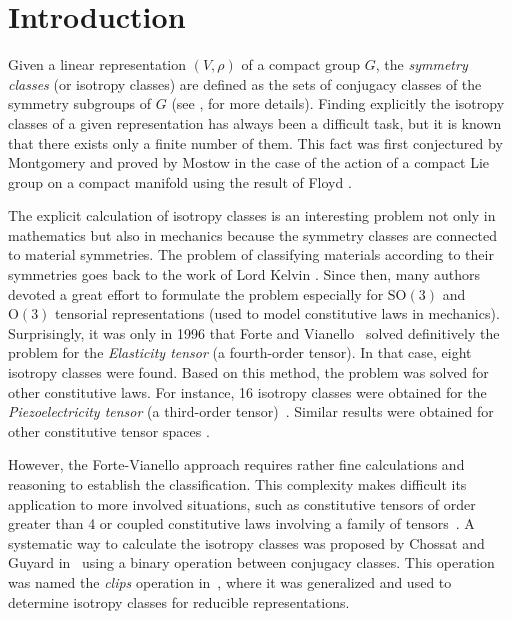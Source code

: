 \documentclass[11pt,a4paper]{amsart}
\theoremstyle{definition}
\newcommand{\OO}{\mathrm{O}}                %
\newcommand{\SO}{\mathrm{SO}}               %
\newcommand{\1}{\mathds{1}}		            %
\begin{document}
\begin{scriptsize}
  \setcounter{tocdepth}{2}
  \tableofcontents
\end{scriptsize}

\section{Introduction}
\label{sec:intro}

Given a linear representation $(V,\rho)$ of a compact group $G$, the \emph{symmetry classes} (or isotropy classes) are defined as the sets of conjugacy classes of the symmetry subgroups of $G$ (see \cite{Bredon1960}, for more details). Finding explicitly the isotropy classes of a given representation has always been a difficult task, but it is known that there exists only a finite number of them. This fact was first conjectured by Montgomery \cite[problem 45]{eilenberg1949} and proved by Mostow in the case of the action of a compact Lie group on a compact manifold \cite{Mostow1957} using the result of Floyd \cite{floyd1957}.

The explicit calculation of isotropy classes is an interesting problem not only in mathematics but also in mechanics because the symmetry classes are connected to material symmetries. The problem of classifying materials according to their symmetries goes back to the work of Lord Kelvin \cite{kelvin1890}. Since then, many authors devoted a great effort to formulate the problem especially for $\SO(3)$ and $\OO(3)$ tensorial representations (used to model constitutive laws in mechanics). Surprisingly, it was only in 1996 that Forte and Vianello~\cite{forte1996} solved definitively the problem for the \emph{Elasticity tensor} (a fourth-order tensor). In that case, eight isotropy classes were found. Based on this method, the problem was solved for other constitutive laws. For instance, 16 isotropy classes were obtained for the \emph{Piezoelectricity tensor} (a third-order tensor)~\cite{Nye1985,ZB1994,Wel2004,New2005,ZTP2013}. Similar results were obtained for other constitutive tensor spaces \cite{forte1997symmetry,LHQ2011}.

However, the Forte-Vianello approach requires rather fine calculations and reasoning to establish the classification. This complexity makes difficult its application to more involved situations, such as constitutive tensors of order greater than 4 or coupled constitutive laws involving a family of tensors~\cite{Jur1974,EM1990}. A systematic way to calculate the isotropy classes was proposed by Chossat and Guyard in~\cite{Chossat1994} using a binary operation between conjugacy classes. This operation was named the \emph{clips} operation in~\cite{Olive2013,Olive2014,Olive2019,Olive2021}, where it was generalized and used to determine isotropy classes for reducible representations.
\end{document}
